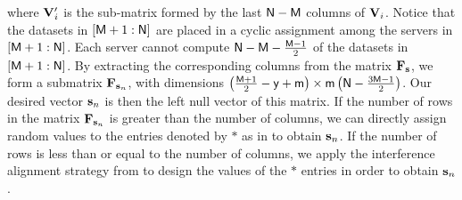 \documentclass[conference,letterpaper]{IEEEtran}
\begin{document}
where ${\bf V}'_i$ is the sub-matrix formed by the last ${\sf N} - {\sf M}$ columns of ${\bf V}_i$.
Notice that the datasets in $[{\sf M}+1 : {\sf N}]$ are placed in a cyclic assignment among the servers in $[{\sf M}+1 : {\sf N}]$. Each server cannot compute ${\sf N} - {\sf M} - \frac{{\sf M} - 1}{2}$ of the datasets in $[{\sf M}+1 : {\sf N}]$. By extracting the corresponding columns from the matrix ${\bf F}_{\bf s}$, we form a submatrix ${\bf F}_{{\bf s}_n}$, with dimensions 
$\left(\frac{{\sf M} + 1}{2} - {\sf y} + {\sf m}\right) \times {\sf m} \left({\sf N} - \frac{3{\sf M} - 1}{2}\right)$.
Our desired vector ${\bf s}_n$ is then the left null vector of this matrix.
If the number of rows in the matrix ${\bf F}_{{\bf s}_n}$ is greater than the number of columns, we can directly assign random values to the entries denoted by $*$ as in \cite{wan2022secure} to obtain ${\bf s}_n$. If the number of rows is less than or equal to the number of columns, we apply the interference alignment strategy from \cite{limit} to design the values of the $*$ entries in order to obtain ${\bf s}_n$.
\end{document}
